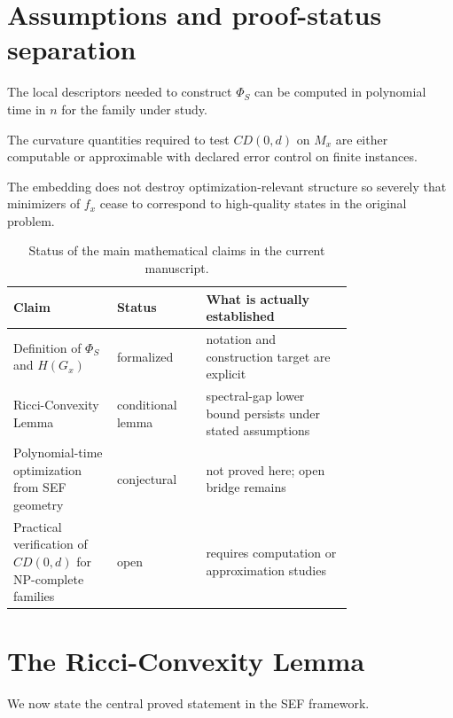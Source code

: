 \documentclass{svjour3}
\begin{document}
\section{Assumptions and proof-status separation}
\begin{assumption}
The local descriptors needed to construct $\Phi_S$ can be computed in polynomial time in $n$ for the family under study.
\end{assumption}

\begin{assumption}
The curvature quantities required to test $CD(0,d)$ on $M_x$ are either computable or approximable with declared error control on finite instances.
\end{assumption}

\begin{assumption}
The embedding does not destroy optimization-relevant structure so severely that minimizers of $f_x$ cease to correspond to high-quality states in the original problem.
\end{assumption}

\begin{table}[t]
\centering
\caption{Status of the main mathematical claims in the current manuscript.}
\label{tab:sef-status}
\small
\begin{tabular}{@{}p{0.24\linewidth}p{0.18\linewidth}p{0.34\linewidth}@{}}
\toprule
Claim & Status & What is actually established \\
\midrule
Definition of $\Phi_S$ and $H(G_x)$ & formalized & notation and construction target are explicit \\
Ricci-Convexity Lemma & conditional lemma & spectral-gap lower bound persists under stated assumptions \\
Polynomial-time optimization from SEF geometry & conjectural & not proved here; open bridge remains \\
Practical verification of $CD(0,d)$ for NP-complete families & open & requires computation or approximation studies \\
\bottomrule
\end{tabular}
\end{table}

\section{The Ricci-Convexity Lemma}
We now state the central proved statement in the SEF framework.
\end{document}
